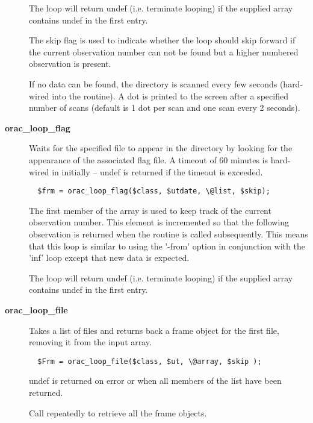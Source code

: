 \begin{description}
The loop will return undef (i.e. terminate looping) if the
supplied array contains undef in the first entry.



The skip flag is used to indicate whether the loop should skip
forward if the current observation number can not be found
but a higher numbered observation is present.



If no data can be found, the directory is scanned every few seconds
(hard-wired into the routine). A dot is printed to the screen after
a specified number of scans (default is 1 dot per scan and one scan every
2 seconds).


\item[\textbf{orac\_loop\_flag}] \mbox{}

Waits for the specified file to appear in the directory
by looking for the appearance of the associated flag file.
A timeout of 60 minutes is hard-wired in initially -- undef
is returned if the timeout is exceeded.

\begin{verbatim}
  $frm = orac_loop_flag($class, $utdate, \@list, $skip);
\end{verbatim}


The first member of the array is used to keep track of the
current observation number. This element is incremented so that
the following observation is returned when the routine is called
subsequently. This means that this loop is similar to using the
'-from' option in conjunction with the 'inf' loop except that
new data is expected.



The loop will return undef (i.e. terminate looping) if the
supplied array contains undef in the first entry.


\item[\textbf{orac\_loop\_file}] \mbox{}

Takes a list of files and returns back a frame object
for the first  file, removing it from the input array.

\begin{verbatim}
  $Frm = orac_loop_file($class, $ut, \@array, $skip );
\end{verbatim}


undef is returned on error or when all members of the
list have been returned.



Call repeatedly to retrieve all the frame objects.




\end{description}
